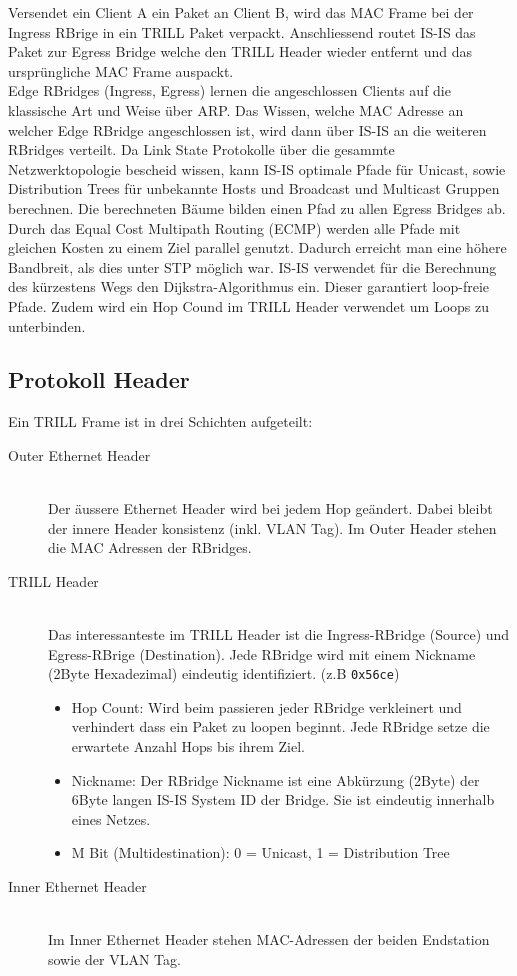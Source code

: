 Versendet ein Client A ein Paket an Client B, wird das MAC Frame bei der Ingress RBrige in ein TRILL Paket verpackt. Anschliessend routet IS-IS das Paket zur Egress Bridge welche den TRILL Header wieder entfernt und das ursprüngliche MAC Frame auspackt.  \\

Edge RBridges (Ingress, Egress) lernen die angeschlossen Clients auf die klassische Art und Weise über ARP. Das Wissen, welche MAC Adresse an welcher Edge RBridge angeschlossen ist, wird dann über IS-IS an die weiteren RBridges verteilt. Da Link State Protokolle über die gesammte Netzwerktopologie bescheid wissen, kann IS-IS optimale Pfade für Unicast, sowie Distribution Trees für unbekannte Hosts und Broadcast und Multicast Gruppen berechnen. Die berechneten Bäume bilden einen Pfad zu allen Egress Bridges ab. Durch das Equal Cost Multipath Routing (ECMP) werden alle Pfade mit gleichen Kosten zu einem Ziel parallel genutzt. Dadurch erreicht man eine höhere Bandbreit, als dies unter STP möglich war. IS-IS verwendet für die Berechnung des kürzestens Wegs den Dijkstra-Algorithmus ein. Dieser garantiert loop-freie Pfade. Zudem wird ein Hop Cound im TRILL Header verwendet um Loops zu unterbinden.

\subsection{Protokoll Header}
Ein TRILL Frame ist in drei Schichten aufgeteilt:
\begin{description}
	\item[Outer Ethernet Header] \hfill \\
	Der äussere Ethernet Header wird bei jedem Hop geändert. Dabei bleibt der innere Header konsistenz (inkl. VLAN Tag). Im Outer Header stehen die MAC Adressen der RBridges.
	\item[TRILL Header] \hfill \\
	Das interessanteste im TRILL Header ist die Ingress-RBridge (Source) und Egress-RBrige (Destination). Jede RBridge wird mit einem Nickname (2Byte Hexadezimal) eindeutig identifiziert. (z.B \lstinline[]|0x56ce|) 
	\begin{itemize}
		\item Hop Count: Wird beim passieren jeder RBridge verkleinert und verhindert dass ein Paket zu loopen beginnt. Jede RBridge setze die erwartete Anzahl Hops bis ihrem Ziel.
		\item Nickname: Der RBridge Nickname ist eine Abkürzung (2Byte) der 6Byte langen IS-IS System ID der Bridge. Sie ist eindeutig innerhalb eines Netzes. 
		\item M Bit (Multidestination): 0 = Unicast, 1 = Distribution Tree
	\end{itemize}
	\item[Inner Ethernet Header] \hfill \\
	Im Inner Ethernet Header stehen MAC-Adressen der beiden Endstation sowie der VLAN Tag.
\end{description}

